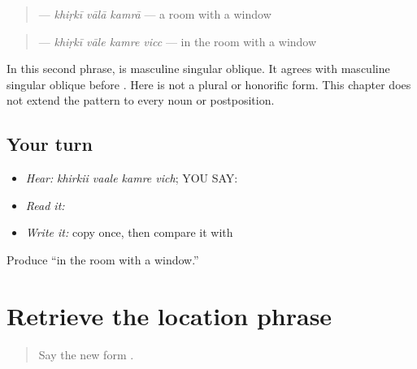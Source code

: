 \begin{grammarlens}[title={Grammar Lens: direct owner}]
\begin{quote}
\textbf{  } — \emph{khiṛkī vālā kamrā} — a room with a window
\end{quote}

\begin{quote}
\textbf{   } — \emph{khiṛkī vāle kamre vicc} — in the room with a window
\end{quote}

In this second phrase, \textbf{} is masculine singular oblique. It agrees with masculine singular oblique \textbf{} before \textbf{}. Here \textbf{} is not a plural or honorific form. This chapter does not extend the pattern to every noun or postposition.
\end{grammarlens}

\subsection*{Your turn}
\begin{itemize}
\raggedright
  \item \emph{Hear:} \emph{khirkii vaale kamre vich}; YOU SAY: \textbf{   }
  \item \emph{Read it:} \textbf{   }
  \item \emph{Write it:} copy \textbf{} once, then compare it with \textbf{}
\end{itemize}

\begin{tcolorbox}[breakable,colback=teal!4,colframe=teal!35!black,title={Before you move on}]
Produce “in the room with a window.”
\end{tcolorbox}
\section[\texorpdfstring{\pa{ਖਿੜਕੀ} \pa{ਵਾਲੇ} \pa{ਕਮਰੇ} \pa{ਵਿੱਚ} (khirkii vaale …)}{ਖਿੜਕੀ ਵਾਲੇ ਕਮਰੇ ਵਿੱਚ (khirkii vaale …)}]{Retrieve the location phrase}

\label{lesson:PA-C195-vale-review}



\begin{quote}
Say the new form \textbf{}.
\end{quote}

